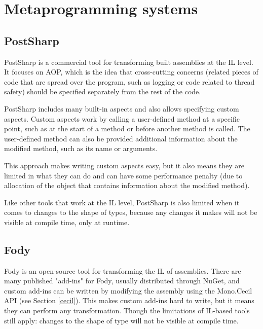 \section{Metaprogramming systems}
\label{metaprogramming}


\subsection{PostSharp}

PostSharp \cite{postsharp} is a commercial tool for transforming built assemblies at the \ac{IL} level. It focuses on \ac{AOP}, which is the idea that cross-cutting concerns (related pieces of code that are spread over the program, such as logging or code related to thread safety) should be specified separately from the rest of the code.

PostSharp includes many built-in aspects and also allows specifying custom aspects. Custom aspects work by calling a user-defined method at a specific point, such as at the start of a method or before another method is called. The user-defined method can also be provided additional information about the modified method, such as its name or arguments.

This approach makes writing custom aspects easy, but it also means they are limited in what they can do and can have some performance penalty (due to allocation of the object that contains information about the modified method).

Like other tools that work at the \ac{IL} level, PostSharp is also limited when it comes to changes to the shape of types, because any changes it makes will not be visible at compile time, only at runtime.

\subsection{Fody}

Fody \cite{fody} is an open-source tool for transforming the \ac{IL} of assemblies. There are many published "add-ins" for Fody, usually distributed through NuGet, and custom add-ins can be written by modifying the assembly using the Mono.Cecil \ac{API} (see Section \ref{cecil}). This makes custom add-ins hard to write, but it means they can perform any transformation. Though the limitations of \ac{IL}-based tools still apply: changes to the shape of type will not be visible at compile time.


